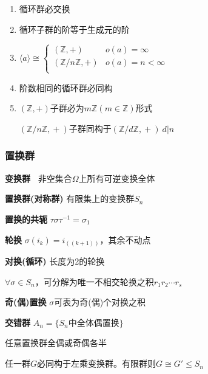 \documentclass[a4paper,10pt]{ctexart}
\newcommand*{\setZ}{\mathbb{Z}}
\renewcommand*{\leq}{\leqslant}
\newcommand*{\gengroup}[1]{\langle #1 \rangle}
\begin{document}
\begin{multicols}{3}
\begin{theorem}[循环群性质]
        \begin{enumerate}
            \item 循环群必交换
            \item 循环子群的阶等于生成元的阶
            \item $\gengroup{a} \cong \begin{cases}
                          (\setZ, +)        & o(a)=\infty       \\
                          (\setZ/n\setZ, +) & o(a) = n < \infty \\
                      \end{cases}$
            \item 阶数相同的循环群必同构
            \item $(\setZ, +)\!$子群必为$m\setZ(m \!\in\! \setZ)$形式

                  $(\setZ/n\setZ,\! +)\!$子群同构于$\!(\setZ/d\setZ,\! +)\  d|n$
        \end{enumerate}
    \end{theorem}

    \subsubsection{置换群}

    \textbf{变换群\ } 非空集合$\Omega$上所有可逆变换全体

    \textbf{置换群(对称群)} 有限集上的变换群$S_n$

    \textbf{置换的共轭} $\tau \sigma \tau^{-1} = \sigma_1$

    \textbf{轮换} $\sigma(i_k) = i_{((k+1))}$，其余不动点

    \textbf{对换(循环)} 长度为2的轮换

    \begin{theorem}[标准轮换分解]
        $\forall \sigma \in S_n$，可分解为唯一不相交轮换之积$r_1 r_2 \cdots r_s$
    \end{theorem}

    \textbf{奇(偶)置换} $\sigma$可表为奇(偶)个对换之积

    \textbf{交错群} $A_n = \{ S_n \text{中全体偶置换} \}$

    \begin{theorem}[置换群性质]
        任意置换群全偶或奇偶各半
    \end{theorem}

    \begin{theorem}[Cayley定理]
        任一群$G$必同构于左乘变换群。有限群则$G \!\cong\! G' \!\leq\! S_n$
    \end{theorem}


\end{multicols}
\end{document}
